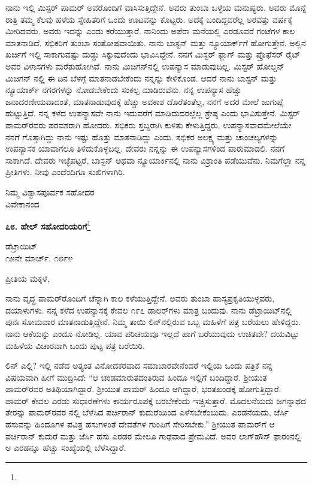 ನಾನು ಇಲ್ಲಿ ಮಿಸ್ಟರ್ ಪಾಮರ್‌ ಅವರೊಂದಿಗೆ ವಾಸಿಸುತ್ತಿದ್ದೇನೆ. ಅವರು ತುಂಬಾ ಒಳ್ಳೆಯ ಮನುಷ್ಯರು. ಅವರು ಮೊನ್ನೆ ರಾತ್ರಿ ತಮ್ಮ ಕೆಲವು ಹಳೆಯ ಸ್ನೇಹಿತರಿಗೆ ಒಂದು ಊಟವನ್ನು ಕೊಟ್ಟರು. ಅದಕ್ಕೆ ಬಂದಿದ್ದವರೆಲ್ಲ ಅರವತ್ತು ವರ್ಷಕ್ಕೆ ಮೀರಿದವರು. ಅವರು ಇದನ್ನು  ಎಂದು ಕರೆಯುತ್ತಾರೆ. ನಾನಿಂದು ಅಪೆರಾ ಮನೆಯಲ್ಲಿ ಎರಡೂವರೆ ಗಂಟೆಗಳ ಕಾಲ ಮಾತನಾಡಿದೆ. ಸಭಿಕರಿಗೆ ತುಂಬಾ ಸಂತೋಷವಾಯಿತು. ನಾನು ಬಾಸ್ಟನ್ ಮತ್ತು ನ್ಯೂಯಾರ್ಕ್‌ಗೆ ಹೋಗುತ್ತೇನೆ. ಅಲ್ಲಿನ ಖರ್ಚಿಗೆ ಇಲ್ಲಿ ಸಾಕಾಗುವಷ್ಟು ದುಡ್ಡು ಸಿಕ್ಕುವುದೆಂದು ಭಾವಿಸಿದ್ದೇನೆ. ನನಗೆ ಮಿಸ್ಟರ್ ಫ್ಲಾಗ್ ಮತ್ತು ಪ್ರೊಫೆಸರ್ ರೈಟ್ ಅವರ ವಿಳಾಸಗಳು ಮರೆತುಹೋಗಿವೆ. ನಾನು ಮಿಚಿಗನ್‌ನಲ್ಲಿ ಉಪನ್ಯಾಸ ಮಾಡುವುದಿಲ್ಲ. ಮಿಸ್ಟರ್ ಹೋಲ್ಡನ್ ಮಿಚಿಗನ್ ನಲ್ಲಿ ಈ ದಿನ ಬೆಳಗ್ಗೆ ಮಾತನಾಡಬೇಕೆಂದು ನನ್ನನ್ನು ಕೇಳಿಕೊಂಡ. ಆದರೆ ನಾನು ಬಾಸ್ಟನ್ ಮತ್ತು ನ್ಯೂಯಾರ್ಕ್ ನಗರಗಳನ್ನು ನೋಡಬೇಕೆಂದು ಸಂಕಲ್ಪ ಮಾಡಿರುವೆನು. ನನ್ನ ಉಪನ್ಯಾಸ ಹೆಚ್ಚು ಜನಾದರಣೀಯವಾದಂತೆ, ಮಾತನಾಡುವುದಕ್ಕೆ ಹೆಚ್ಚು ಅವಕಾಶ ದೊರೆತಂತೆಲ್ಲ, ನನಗೆ ಅದರ ಮೇಲೆ ಜುಗುಪ್ಸೆ ಹುಟ್ಟುತ್ತಿದೆ. ನನ್ನ ಕಳೆದ ಉಪನ್ಯಾಸವೇ ನಾನು ಇದುವರೆಗೆ ಮಾಡಿದುದರಲ್ಲೆಲ್ಲ ಶ್ರೇಷ್ಠ ಎಂದು ಭಾವಿಸುತ್ತೇನೆ. ಮಿಸ್ಟರ್ ಪಾಮರ್‌ರವರು ಪರವಶರಾಗಿ ಹೋದರು. ಸಭಿಕರು ಸ್ತಬ್ದರಾಗಿ ಕುಳಿತು ಕೇಳುತ್ತಿದ್ದರು. ಉಪನ್ಯಾಸವಾದಮೇಲೆಯೇ ನನಗೆ ಗೊತ್ತಾಗಿದ್ದು ನಾನು ಇಷ್ಟು ಹೊತ್ತು ಮಾತನಾಡಿದ್ದು ಎಂದು. ಸಭಿಕರ ಅಲಕ್ಷ್ಯ ಮತ್ತು ಚಾಂಚಲ್ಯಗಳನ್ನು ಉಪನ್ಯಾಸಕ ಯಾವಾಗಲೂ ತಿಳಿದುಕೊಳ್ಳಬಲ್ಲ. ದೇವರು ನನ್ನನ್ನು ಈ ಉಪನ್ಯಾಸಗಳಿಂದ ಪಾರುಮಾಡಲಿ. ನನಗೆ ಸಾಕಾಗಿದೆ. ದೇವರು ಇಚ್ಛೆಪಟ್ಟರೆ, ಬಾಸ್ಟನ್ ಅಥವಾ ನ್ಯೂಯಾರ್ಕಿನಲ್ಲಿ ನಾನು ವಿಶ್ರಾಂತಿ ಪಡೆಯುವೆನು. ನಿಮಗೆಲ್ಲಾ ನನ್ನ ಪ್ರೀತಿಗಳು. ನೀವು ಎಂದೆಂದಿಗೂ ಸುಖಿಗಳಾಗಿರಿ.

{\flushright
ನಿಮ್ಮ ವಿಶ್ವಾಸಪೂರ್ವಕ ಸಹೋದರ\\ವಿವೇಕಾನಂದ\par}

\newpage

\begin{center}
\textbf{೭೮. ಹೇಲ್ ಸಹೋದರಿಯರಿಗೆ}\footnote{}
\end{center}

\begin{flushright}
ಡೆಟ್ರಾಯಿಟ್\\೧೫ನೇ ಮಾರ್ಚ್, ೧೮೯೪
\end{flushright}

\noindent
ಪ್ರೀತಿಯ ಮಕ್ಕಳೆ,

ನಾನು ವೃದ್ಧ ಪಾಮರ್‌ರೊಂದಿಗೆ ಚೆನ್ನಾಗಿ ಕಾಲ ಕಳೆಯುತ್ತಿದ್ದೇನೆ. ಅವರು ತುಂಬಾ ಹಾಸ್ಯಪ್ರಕೃತಿಯುಳ್ಳವರು, ದಯಾಳುಗಳು. ನನ್ನ ಕಳೆದ ಉಪನ್ಯಾಸಕ್ಕೆ ಕೇವಲ ೧೯೭ ಡಾಲರ್‌ಗಳು ಮಾತ್ರ ಬಂದುವು. ನಾನು ಡೆಟ್ರಾಯಿಟ್‌ನಲ್ಲಿ ಪುನಃ ಸೋಮವಾರ ಮಾತನಾಡುತ್ತಿದ್ದೇನೆ. ನಿಮ್ಮ ತಾಯಿ ಲಿನ್‌ನಲ್ಲಿರುವ ಒಬ್ಬ ಮಹಿಳೆಗೆ ಪತ್ರ ಬರೆಯಲು ಹೇಳಿದ್ದರು. ನಾನು ಆಕೆಯನ್ನು ಎಂದೂ ನೋಡಿಲ್ಲ. ಯಾವ ಪರಿಚಯವೂ ಇಲ್ಲದೆ ಹಾಗೆ ಬರೆಯುವುದು ಉಚಿತವೇ? ದಯವಿಟ್ಟು ಮಹಿಳೆಯ ವಿಚಾರವಾಗಿ ಒಂದು ಪುಟ್ಟ ಪತ್ರ ಬರೆಯಿರಿ.

ಲಿನ್ ಎಲ್ಲಿ? ಇಲ್ಲಿ ನಡೆದ ಅತ್ಯಂತ ವಿನೋದಕರವಾದ ಸಮಾಚಾರವೇನೆಂದರೆ ಇಲ್ಲಿಯ ಒಂದು ಪತ್ರಿಕೆ ನನ್ನ ವಿಷಯವಾಗಿ ಹೀಗೆ ಮುದ್ರಿಸಿದೆ: “ಆ ಚಂಡಮಾರುತದಂತಿರುವ ಹಿಂದೂ ಇಲ್ಲಿಗೆ ಬಂದಿದ್ದಾರೆ. ಶ‍್ರೀಯುತ ಪಾಮರ್‌ರವರ ಅತಿಥಿಯಾಗಿದ್ದಾರೆ. ಶ‍್ರೀಯುತ ಪಾಮರ್ ಹಿಂದೂ ಆಗಿದ್ದಾರೆ, ಭರತಖಂಡಕ್ಕೆ ಹೋಗುತ್ತಿದ್ದಾರೆ. ಪಾಮರ್‌ ಕೇವಲ ಎರಡು ಸುಧಾರಣೆಗಳು ಕಾರ್ಯರೂಪಕ್ಕೆ ಬರಬೇಕೆಂದು ಇಚ್ಚಿಸುತ್ತಾರೆ. ಮೊದಲನೆಯದು ಜಗನ್ನಾಥದ ತೇರನ್ನು ಪಾಮರ್‌ರವರ  ನಲ್ಲಿ ಬೆಳೆಸಿದ ಪರ್ಚಿರಾನ್  ಕುದುರೆಯಿಂದ ಎಳೆಸಬೇಕೆಂಬುದು. ಎರಡನೆಯದು, ಜೆರ್ಸಿ ಹಸುವನ್ನು ಹಿಂದೂಗಳ ಪವಿತ್ರ ಹಸುಗಳಂತೆ ದೇವತೆಗಳ ಗುಂಪಿಗೆ ಸೇರಿಸಬೇಕು.'' ಶ‍್ರೀಯುತ ಪಾಮರ್‌ಗೆ ಆ ಪರ್ಚಿರಾನ್ ಕುದುರೆ ಮತ್ತು ಜೆರ್ಸಿ ಹಸು ಎರಡರ ಮೇಲೂ ಗಾಢವಾದ ಪ್ರೇಮವಿದೆ. ಅವರ ಲಾಗ್‌ಹೌಸ್ ಫಾರಂನಲ್ಲಿ ಆ ಎರಡನ್ನೂ ಹೆಚ್ಚು ಸಂಖ್ಯೆಯಲ್ಲಿ ಬೆಳೆಸಿದ್ದಾರೆ.

